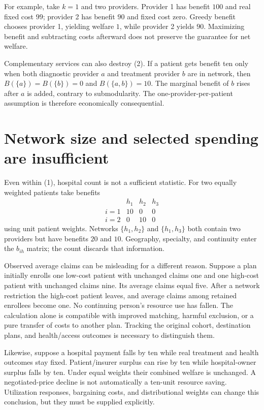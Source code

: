 \documentclass[11pt,a4paper]{article}
\begin{document}
For example, take $k=1$ and two providers. Provider 1 has benefit $100$ and real fixed cost $99$; provider 2 has benefit $90$ and fixed cost zero. Greedy benefit chooses provider 1, yielding welfare $1$, while provider 2 yields $90$. Maximizing benefit and subtracting costs afterward does not preserve the guarantee for net welfare.

Complementary services can also destroy (2). If a patient gets benefit ten only when both diagnostic provider $a$ and treatment provider $b$ are in network, then $B(\{a\})=B(\{b\})=0$ and $B(\{a,b\})=10$. The marginal benefit of $b$ rises after $a$ is added, contrary to submodularity. The one-provider-per-patient assumption is therefore economically consequential.
\section{Network size and selected spending are insufficient}
Even within (1), hospital count is not a sufficient statistic. For two equally weighted patients take benefits
\[
 \begin{array}{c|ccc}
 &h_1&h_2&h_3\\ \hline
 i=1&10&0&0\\
 i=2&0&10&0
 \end{array}
\]
using unit patient weights. Networks $\{h_1,h_2\}$ and $\{h_1,h_3\}$ both contain two providers but have benefits $20$ and $10$. Geography, specialty, and continuity enter the $b_{ih}$ matrix; the count discards that information.

Observed average claims can be misleading for a different reason. Suppose a plan initially enrolls one low-cost patient with unchanged claims one and one high-cost patient with unchanged claims nine. Its average claims equal five. After a network restriction the high-cost patient leaves, and average claims among retained enrollees become one. No continuing person's resource use has fallen. The calculation alone is compatible with improved matching, harmful exclusion, or a pure transfer of costs to another plan. Tracking the original cohort, destination plans, and health/access outcomes is necessary to distinguish them.

Likewise, suppose a hospital payment falls by ten while real treatment and health outcomes stay fixed. Patient/insurer surplus can rise by ten while hospital-owner surplus falls by ten. Under equal weights their combined welfare is unchanged. A negotiated-price decline is not automatically a ten-unit resource saving. Utilization responses, bargaining costs, and distributional weights can change this conclusion, but they must be supplied explicitly.
\end{document}
